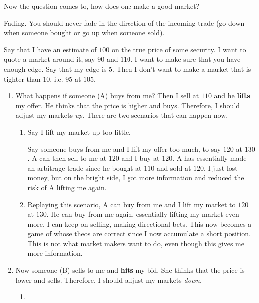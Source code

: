\documentclass{article}
\begin{document}
    Now the question comes to, how does one make a good market? 

    Fading. You should never fade in the direction of the incoming trade (go down when someone bought or go up when someone sold). 

    Say that I have an estimate of $100$ on the true price of some security. I want to quote a market around it, say $90$ and $110$. I want to make sure that you have enough edge. Say that my edge is $5$. Then I don't want to make a market that is tighter than $10$, i.e. $95$ at $105$.
    \begin{enumerate}
      \item What happens if someone (A) buys from me? Then I sell at $110$ and he \textbf{lifts} my offer. He thinks that the price is higher and buys. Therefore, I should adjust my markets \textit{up}. There are two scenarios that can happen now. 

        \begin{enumerate}
          \item Say I lift my market up too little. 

            Say someone buys from me and I lift my offer too much, to say $120$ at $130$. A can then sell to me at $120$ and I buy at $120$. A has essentially made an arbitrage trade since he bought at $110$ and sold at $120$. I just lost money, but on the bright side, I got more information and reduced the risk of A lifting me again.

          \item Replaying this scenario, A can buy from me and I lift my market to $120$ at $130$. He can buy from me again, essentially lifting my market even more. I can keep on selling, making directional bets. This now becomes a game of whose theos are correct since I now accumulate a short position. This is not what market makers want to do, even though this gives me more information.
        \end{enumerate}

      \item Now someone (B) sells to me and \textbf{hits} my bid. She thinks that the price is lower and sells. Therefore, I should adjust my markets \textit{down}.

        \begin{enumerate}
          \item 
        \end{enumerate}
    \end{enumerate}
\end{document}
